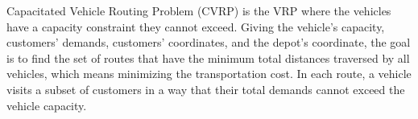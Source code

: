 \documentclass[../main.tex]{}
\begin{document}
Capacitated Vehicle Routing Problem (CVRP) is the VRP where the vehicles have a capacity constraint they cannot exceed. Giving the vehicle’s capacity, customers’ demands, customers’ coordinates, and the depot’s coordinate, the goal is to find the set of routes that have the minimum total distances traversed by all vehicles, which means minimizing the transportation cost. In each route, a vehicle visits a subset of customers in a way that their total demands cannot exceed the vehicle capacity. 
\end{document}
